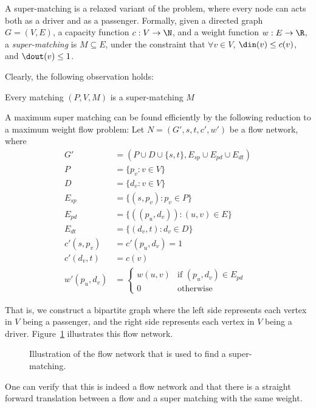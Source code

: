 A super-matching is a relaxed variant of the \CARPOOL{} problem, 
where every node can acts both as a driver and as a passenger. 
Formally, given a directed graph $G = (V, E)$, 
a capacity function $ c: V \rightarrow \N $,
and a weight function $w : E \rightarrow \R$,
a \emph{super-matching} is $M \subseteq E$, 
under the constraint that $\forall v \in V$,
$\din(v) \leq c(v)$, and $\dout(v) \leq 1$. 

Clearly, the following observation holds:
\begin{observation}
Every matching $(P, V, M)$ is a super-matching $M$
\end{observation}

A maximum super matching can be found efficiently by the following reduction 
to a maximum weight flow problem: 
Let $N = (G', s, t, c', w')$ be a flow network, where 
\begin{align*}
G'				& = (P \cup D \cup \{s, t\}, E_{sp} \cup E_{pd} \cup E_{dt})	\\
P				& = \{p_v : v \in V\}					\\
D				& = \{d_v : v \in V\}					\\
E_{sp}			& = \{ (s, p_v) : p_v \in P \}			\\
E_{pd}			& = \{ ((p_u, d_v)) : (u, v) \in E \}	\\
E_{dt}			& = \{ (d_v, t) : d_v \in D \}			\\
c'(s, p_v)		& = c'(p_u, d_v) = 1					\\
c'(d_v, t)		& = c(v)								\\
w'(p_u, d_v)	& = 
\begin{cases}
w(u, v) & \text{if } (p_u, d_v) \in E_{pd} \\
0 & \text{otherwise}	
\end{cases}
\end{align*}

That is, 
we construct a bipartite graph where the left side represents each vertex 
in $V$ being a passenger,
and the right side represents each vertex in $V$ being a driver.
Figure~\ref{fig:cm-flow} illustrates this flow network.
%
\begin{figure}
\centering

\caption{
\label{fig:cm-flow}
Illustration of the flow network that is used to find a super-matching.
}
\end{figure}
%
One can verify that this is indeed a flow network and that there is a straight forward 
translation between a flow and a super matching with the same weight.
